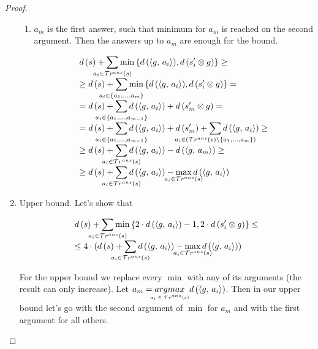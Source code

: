 \begin{proof}
\begin{enumerate}
\begin{enumerate}
    \item $a_m$ is the first answer, such that minimum for $a_m$ is reached on the second argument. Then the answers up to $a_m$ are enough for the bound. 
    
    \[ \begin{array}{l}
        d\,(s) + \smashoperator[lr]{\sum\limits_{a_i \in \tra{s}}} \min\,\{ d\,(\taskst{g}{a_i}), d\,(s'_i \otimes g)\} \ge \\
        \ge d\,(s) + \smashoperator[lr]{\sum\limits_{a_i \in \{ a_1, \dots, a_m \}}} \min\,\{ d\,(\taskst{g}{a_i}), d\,(s'_i \otimes g)\} = \\
        = d\,(s) + \smashoperator[lr]{\sum\limits_{a_i \in \{ a_1, \dots, a_{m - 1} \}}} d\,(\taskst{g}{a_i}) + d\,(s'_m \otimes g) = \\
        = d\,(s) + \smashoperator[lr]{\sum\limits_{a_i \in \{ a_1, \dots, a_{m - 1} \}}} d\,(\taskst{g}{a_i}) + d\,(s'_m) + \smashoperator[lr]{\sum\limits_{a_i \in (\tra{s} \setminus \{ a_{1}, \dots, a_{m} \})}} d\,(\taskst{g}{a_i})  \ge \\
        \ge d\,(s) + \smashoperator[lr]{\sum\limits_{a_i \in \tra{s}}} d\,(\taskst{g}{a_i}) -  d\,(\taskst{g}{a_m}) \ge \\
        \ge d\,(s) + \smashoperator[lr]{\sum\limits_{a_i \in \tra{s}}} d\,(\taskst{g}{a_i}) -  \smashoperator{\max\limits_{a_i \in \tra{s}}} d\,(\taskst{g}{a_i}) \\
  \end{array} \]
  \end{enumerate}

  \item 
  Upper bound. Let's show that 
  
  \[ \begin{array}{l}
  d\,(s) + \smashoperator[lr]{\sum\limits_{a_i \in \tra{s}}} \min\,\{2\cdot d\,(\taskst{g}{a_i}) - 1, 2\cdot d\,(s'_i \otimes g)\}  \le \\
  \le 4 \cdot (d\,(s) + \smashoperator[lr]{\sum\limits_{a_i \in \tra{s}}} d\,(\taskst{g}{a_i}) - \smashoperator{\max\limits_{a_i \in \tra{s}}} d\,(\taskst{g}{a_i})) \\
  \end{array} \]
  
  For the upper bound we replace every $\min$ with any of its arguments (the result can only increase). Let $a_m = \argmax{a_i \in \tra{s}} d\,(\taskst{g}{a_i})$. Then in our upper bound let's go with the second argument of $\min$ for $a_m$ and with the first argument for all others.
  

\end{enumerate}
\end{proof}
